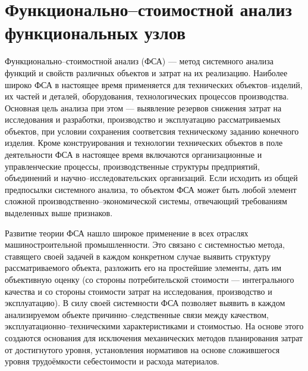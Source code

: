 \section{Функционально--стоимостной анализ функциональных узлов}
Функционально--стоимостной анализ (ФСА) --- метод системного
анализа функций и свойств различных объектов и затрат на их
реализацию.
Наиболее широко ФСА в настоящее время применяется для технических
объектов--изделий, их частей и деталей, оборудования, технологических процессов
производства.
Основная цель анализа при этом --- выявление резервов снижения затрат на
исследования и разработки, производство и эксплуатацию рассматриваемых объектов,
при условии сохранения соответсвия техническому заданию конечного изделия.
Кроме конструирования и технологии технических объектов в поле деятельности ФСА
в настоящее время включаются организационные и управленческие процессы,
производственные структуры предприятий, объединений и научно--исследовательских
организаций.
Если исходить из общей предпосылки системного анализа, то объектом ФСА может
быть любой элемент сложной производственно--экономической системы, отвечающий
требованиям выделенных выше признаков.


Развитие теории ФСА нашло широкое применение в всех отраслях машиностроительной
промышленности.
Это связано с системностью метода, ставящего своей задачей в каждом конкретном
случае выявить структуру рассматриваемого объекта, разложить его на простейшие
элементы, дать им объективную оценку (со стороны потребительской стоимости ---
интегрального качества и со стороны стоимости затрат на исследования,
производство и эксплуатацию).
В силу своей системности ФСА позволяет выявить в каждом анализируемом объекте
причинно--следственные связи между качеством, эксплуатационно--техническими
характеристиками и стоимостью.
На основе этого создаются основания для исключения механических методов
планирования затрат от достигнутого уровня, установления нормативов на основе
сложившегося уровня трудоёмкости себестоимости и расхода материалов.


